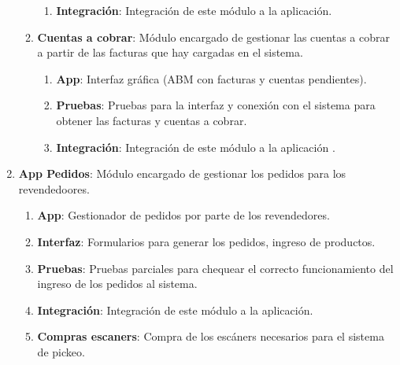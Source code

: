 \documentclass{article}
\begin{document}
\begin{enumerate}
\begin{enumerate}[label*=\arabic*.]
\begin{enumerate}[label*=\arabic*.]
						\item \textbf{Integración}: Integración de este módulo a la aplicación.

					\end{enumerate}

				\item \textbf{Cuentas a cobrar}: Módulo encargado de gestionar las cuentas a cobrar a partir de las facturas que hay cargadas en el sistema.

					\begin{enumerate}[label*=\arabic*.]
						\itemsep=3pt \topsep=0pt \partopsep=0pt \parskip=0pt \parsep=0pt

						\item \textbf{App}: Interfaz gráfica (ABM con facturas y cuentas pendientes).

						\item \textbf{Pruebas}: Pruebas para la interfaz y conexión con el sistema para obtener las facturas y cuentas a cobrar.

						\item \textbf{Integración}:  Integración de este módulo a la aplicación .

					\end{enumerate}

			\end{enumerate}

		\item \textbf{App Pedidos}: Módulo encargado de gestionar los pedidos para los revendedoores.

			\begin{enumerate}[label*=\arabic*.]

				\item \textbf{App}: Gestionador de pedidos por parte de los revendedores.
			
				\item \textbf{Interfaz}: Formularios para generar los pedidos, ingreso de productos.

				\item \textbf{Pruebas}: Pruebas parciales para chequear el correcto funcionamiento del ingreso de los pedidos al sistema.

				\item \textbf{Integración}: Integración de este módulo a la aplicación.

				\item \textbf{Compras escaners}: Compra de los escáners necesarios para el sistema de pickeo.

			\end{enumerate}


\end{enumerate}
\end{document}
